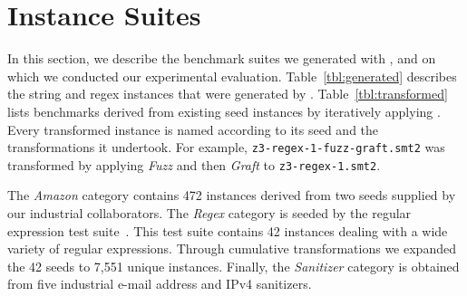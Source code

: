 \section{Instance Suites}
\label{sec:suites}

In this section, we describe the benchmark suites we generated
with \fuzzer{}, and on which we conducted our experimental
evaluation. Table~\ref{tbl:generated} describes the string
and regex instances that were
generated by \generator{}. Table~\ref{tbl:transformed} lists benchmarks
derived from existing seed instances by iteratively applying \transformer{}.
Every transformed instance is named according to its
seed and the transformations it undertook. For example,
\texttt{z3-regex-1-fuzz-graft.smt2} was transformed by applying
\textit{Fuzz} and then \textit{Graft} to \texttt{z3-regex-1.smt2}.

The \textit{Amazon} category contains 472 instances derived from two seeds
supplied by our industrial collaborators. The \textit{Regex} category is
seeded by the \usOld{} regular expression test suite~\cite{z3str2-tests}. This
test suite contains 42 instances dealing with a wide variety of regular
expressions. Through cumulative transformations we expanded the 42 seeds to 7,551 unique
instances. Finally, the \textit{Sanitizer} category is obtained from
five industrial e-mail address and IPv4 sanitizers.

